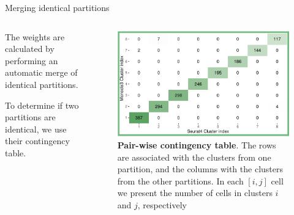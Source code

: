 \begin{frame}{Merging identical partitions}
    \begin{columns}
        \begin{column}{0.45\textwidth}
            \justifying

            The weights are calculated by performing an automatic merge of identical partitions.
            \bigskip

            To determine if two partitions are identical, we use their contingency table.
        \end{column}

        \begin{column}{0.5\textwidth}
            \begin{figure}
                \centering
                \includegraphics[width=\textwidth]{images/ch2/2_cont_table.png}
                \caption{\justifying \textbf{Pair-wise contingency table}. The rows are associated with the clusters from one partition, and the columns with the clusters from the other partitions. In each $[i,j]$ cell we present the number of cells in clusters $i$ and $j$, respectively}
            \end{figure}
        \end{column}
    \end{columns}
    
\end{frame}
